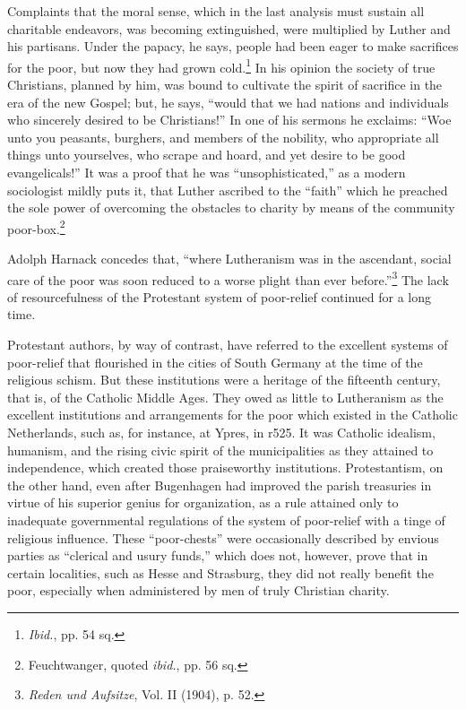 Complaints that the moral sense, which in the last analysis must
sustain all charitable endeavors, was becoming extinguished, were
multiplied by Luther and his partisans. Under the papacy, he says,
people had been eager to make sacrifices for the poor, but now they
had grown cold.\footnote{\textit{Ibid.}, pp. 54 sq.}
 In his opinion the society of true Christians,
planned by him, was bound to cultivate the spirit of sacrifice in the
era of the new Gospel; but, he says, “would that we had nations and
individuals who sincerely desired to be Christians!” In one of his
sermons he exclaims: “Woe unto you peasants, burghers, and members of
the nobility, who appropriate all things unto yourselves, who
scrape and hoard, and yet desire to be good evangelicals!” It was a
proof that he was “unsophisticated,” as a modern sociologist mildly
puts it, that Luther ascribed to the “faith” which he preached the
sole power of overcoming the obstacles to charity by means of the
community poor-box.\footnote{Feuchtwanger, quoted \textit{ibid.}, pp. 56 sq.}

Adolph Harnack concedes that, “where Lutheranism was in the
ascendant, social care of the poor was soon reduced to a worse plight
than ever before.”\footnote{\textit{Reden und Aufsitze}, Vol. II (1904), p. 52.}
 The lack of resourcefulness of the Protestant
system of poor-relief continued for a long time.

Protestant authors, by way of contrast, have referred to the excellent
systems of poor-relief that flourished in the cities of South Germany at the
time of the religious schism. But these institutions were a heritage of the
fifteenth century, that is, of the Catholic Middle Ages. They owed as little
to Lutheranism as the excellent institutions and arrangements for the poor
which existed in the Catholic Netherlands, such as, for instance, at Ypres,
in r525. It was Catholic idealism, humanism, and the rising civic spirit of
the municipalities as they attained to independence, which created those
praiseworthy institutions. Protestantism, on the other hand, even after
Bugenhagen had improved the parish treasuries in virtue of his superior genius
for organization, as a rule attained only to inadequate governmental regulations
of the system of poor-relief with a tinge of religious influence. These
“poor-chests” were occasionally described by envious parties as “clerical and
usury funds,” which does not, however, prove that in certain localities, such
as Hesse and Strasburg, they did not really benefit the poor, especially when
administered by men of truly Christian charity.

